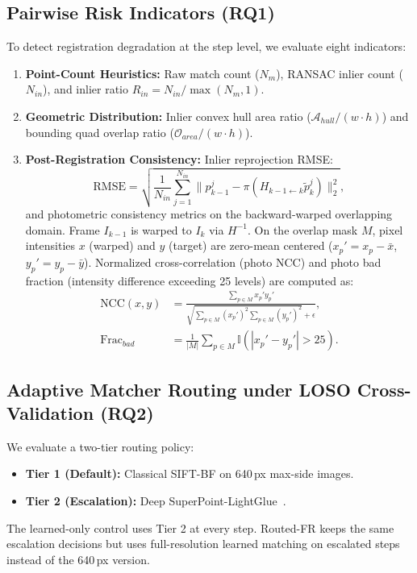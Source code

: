 \documentclass[conference]{IEEEtran}
\begin{document}
\subsection{Pairwise Risk Indicators (RQ1)}
\label{subsec:indicators}

To detect registration degradation at the step level, we evaluate eight indicators:
\begin{enumerate}
    \item \textbf{Point-Count Heuristics:} Raw match count ($N_m$), RANSAC inlier count ($N_{in}$), and inlier ratio $R_{in} = N_{in} / \max(N_m, 1)$.
    \item \textbf{Geometric Distribution:} Inlier convex hull area ratio ($\mathcal{A}_{hull} / (w \cdot h)$) and bounding quad overlap ratio ($\mathcal{O}_{area} / (w \cdot h)$).
    \item \textbf{Post-Registration Consistency:} Inlier reprojection RMSE:
    \begin{equation}
    \text{RMSE} = \sqrt{\frac{1}{N_{in}} \sum_{j=1}^{N_{in}} \| p_{k-1}^j - \pi(H_{k-1 \leftarrow k} \tilde{p}_k^j) \|_2^2},
    \label{eq:rmse_inlier}
    \end{equation}
    and photometric consistency metrics on the backward-warped overlapping domain. Frame $I_{k-1}$ is warped to $I_k$ via $H^{-1}$. On the overlap mask $M$, pixel intensities $x$ (warped) and $y$ (target) are zero-mean centered ($x_p' = x_p - \bar{x}$, $y_p' = y_p - \bar{y}$). Normalized cross-correlation (photo NCC) and photo bad fraction (intensity difference exceeding 25 levels) are computed as:
    \begin{align}
    \text{NCC}(x, y) &= \frac{\sum_{p \in M} x_p' y_p'}{\sqrt{\sum_{p \in M} (x_p')^2 \sum_{p \in M} (y_p')^2} + \epsilon}, \label{eq:ncc} \\
    \text{Frac}_{bad} &= \frac{1}{|M|} \sum_{p \in M} \mathbb{I}(|x_p' - y_p'| > 25). \label{eq:photo_bad}
    \end{align}
\end{enumerate}

\subsection{Adaptive Matcher Routing under LOSO Cross-Validation (RQ2)}
\label{subsec:routing_method}

We evaluate a two-tier routing policy:
\begin{itemize}
    \item \textbf{Tier 1 (Default):} Classical SIFT-BF on 640\,px max-side images.
    \item \textbf{Tier 2 (Escalation):} Deep SuperPoint-LightGlue~\cite{detone2018,lindenberger2023}.
\end{itemize}
The learned-only control uses Tier 2 at every step. Routed-FR keeps the same escalation decisions but uses full-resolution learned matching on escalated steps instead of the 640\,px version.
\end{document}
